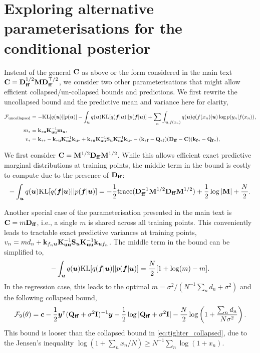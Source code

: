 \section{Exploring alternative parameterisations for the conditional posterior}
Instead of the general ${\mathbf{C}}$ as above or the form considered in the main text ${\mathbf{C}} = \mathbf{D}_{\mathbf{ff}}^{1/2}{\mathbf{M}} \mathbf{D}_{\mathbf{ff}}^{\top/2}$, we consider two other parameterisations that might allow efficient collapsed/un-collapsed bounds and predictions. We first rewrite the uncollapsed bound and the predictive mean and variance here for clarity,
\begin{align*}
    {\mathcal{F}}_{\textrm{uncollapsed}}
        &= - \mathrm{KL} [q({\bm{u}}) || p({\bm{u}})] - \int_{\bm{u}} q({\bm{u}}) \mathrm{KL} [q({\bm{f}} | {\bm{u}}) || p({\bm{f}} | {\bm{u}})] +  \sum_{n} \int_{{\bm{u}}, f(x_n)} q({\bm{u}}) q(f({x_n}) | {\bm{u}}) \log p(y_n | f({x_n})), \\
    m_* &= \mathbf{k}_{\mathbf{*u}} \mathbf{K}_{\mathbf{uu}}^{-1} {\mathbf{m}}_{\bm{u}}, \\
    v_* &= \mathbf{k}_{\mathbf{**}} - \mathbf{k}_{\mathbf{*u}} \mathbf{K}_{\mathbf{uu}}^{-1} \mathbf{k}_{\mathbf{u*}} + \mathbf{k}_{\mathbf{*u}} \mathbf{K}_{\mathbf{uu}}^{-1} {\mathbf{S}}_{\bm{u}} \mathbf{K}_{\mathbf{uu}}^{-1} \mathbf{k}_{\mathbf{u*}} - (\mathbf{k}_{\mathbf{*f}} - \mathbf{Q}_{\mathbf{*f}}) (\mathbf{D}_{\mathbf{ff}} - {\mathbf{C}}) (\mathbf{k}_{\mathbf{f*}}- \mathbf{Q}_{\mathbf{f*}}),
\end{align*}

We first consider ${\mathbf{C}} = {\mathbf{M}}^{1/2}\mathbf{D}_{\mathbf{ff}}{\mathbf{M}}^{1/2}$. While this allows efficient exact predictive marginal distributions at training points, the middle term in the bound is costly to compute due to the presence of $\mathbf{D}_{\mathbf{ff}}$: 
\begin{align}
    - \int_{\bm{u}} q({\bm{u}}) \mathrm{KL} [q({\bm{f}} | {\bm{u}}) || p({\bm{f}} | {\bm{u}})]
    = - \frac{1}{2} \mathrm{trace}(\mathbf{D}_{\mathbf{ff}}^{-1}{\mathbf{M}}^{1/2}\mathbf{D}_{\mathbf{ff}}{\mathbf{M}}^{1/2}) + \frac{1}{2}\log |{\mathbf{M}}| + \frac{N}{2}\nonumber.
\end{align}

Another special case of the parameterisation presented in the main text is ${\mathbf{C}} = m \mathbf{D}_{\mathbf{ff}}$, i.e., a single $m$ is shared across all training points. This conveniently leads to tractable exact predictive variances at training points, $v_n = m d_n + \mathbf{k}_{f_n{\bm{u}}} \mathbf{K}_{\mathbf{uu}}^{-1} {\mathbf{S}}_{\bm{u}} \mathbf{K}_{\mathbf{uu}}^{-1} \mathbf{k}_{{\bm{u}} f_n}$. The middle term in the bound can be simplified to,
\begin{align}
    - \int_{\bm{u}} q({\bm{u}}) \mathrm{KL} [q({\bm{f}} | {\bm{u}}) || p({\bm{f}} | {\bm{u}})]
    = \frac{N}{2}[1 + \log(m) - m] \nonumber.
\end{align}
In the regression case, this leads to  the optimal $m = \sigma^2 / (N^{-1}\sum_n d_n + \sigma^2)$ and the following collapsed bound,
\begin{align}
    {\mathcal{F}}_9(\theta) ={\bm{c}} - \frac{1}{2} {\bm{y}}^\intercal (\mathbf{Q}_{\mathbf{ff}} + \sigma^2{\mathbf{I}})^{-1} {\bm{y}} - \frac{1}{2} \log |\mathbf{Q}_{\mathbf{ff}} + \sigma^2{\mathbf{I}}| - \frac{N}{2} \log \left( 1+\frac{\sum_n d_n}{N\sigma^2} \right).
\end{align}
This bound is looser than the collapsed bound in \cref{eq:tighter_collapsed}, due to the Jensen's inequality $\log (1 + \sum_n x_n / N) \geq N^{-1}\sum_n \log(1 + x_n)$.

